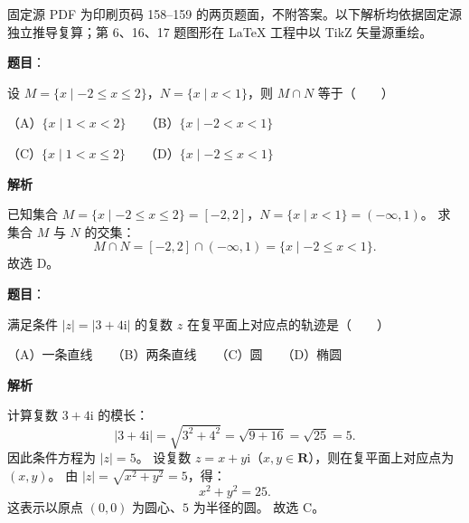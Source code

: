 

\begin{gktip}
固定源 PDF 为印刷页码 158–159 的两页题面，不附答案。以下解析均依据固定源独立推导复算；第 6、16、17 题图形在 LaTeX 工程中以 TikZ 矢量源重绘。
\end{gktip}

\begin{answer}

\textbf{题目}：

设 $M=\{x\mid -2\le x\le 2\}$，$N=\{x\mid x<1\}$，则 $M\cap N$ 等于\mbox{（　　）}

（A）$\{x\mid 1<x<2\}$　　（B）$\{x\mid -2<x<1\}$

（C）$\{x\mid 1<x\le 2\}$　　（D）$\{x\mid -2\le x<1\}$

\textbf{解析}

已知集合 $M=\{x\mid -2\le x\le 2\}=[-2, 2]$，$N=\{x\mid x<1\}=(-\infty, 1)$。
求集合 $M$ 与 $N$ 的交集：
\nopagebreak[4]
\[
M\cap N=[-2, 2]\cap (-\infty, 1)=\{x\mid -2\le x<1\}.
\]
故选 D。


\end{answer}
\begin{answer}

\textbf{题目}：

满足条件 $|z|=|3+4\mathrm{i}|$ 的复数 $z$ 在复平面上对应点的轨迹是\mbox{（　　）}

（A）一条直线　　（B）两条直线　　（C）圆　　（D）椭圆

\textbf{解析}

计算复数 $3+4\mathrm{i}$ 的模长：
\nopagebreak[4]
\[
|3+4\mathrm{i}|=\sqrt{3^2+4^2}=\sqrt{9+16}=\sqrt{25}=5.
\]
因此条件方程为 $|z|=5$。
设复数 $z=x+y\mathrm{i}$（$x, y\in\mathbf{R}$），则在复平面上对应点为 $(x, y)$。
由 $|z|=\sqrt{x^2+y^2}=5$，得：
\nopagebreak[4]
\[
x^2+y^2=25.
\]
这表示以原点 $(0,0)$ 为圆心、$5$ 为半径的圆。
故选 C。


\end{answer}

